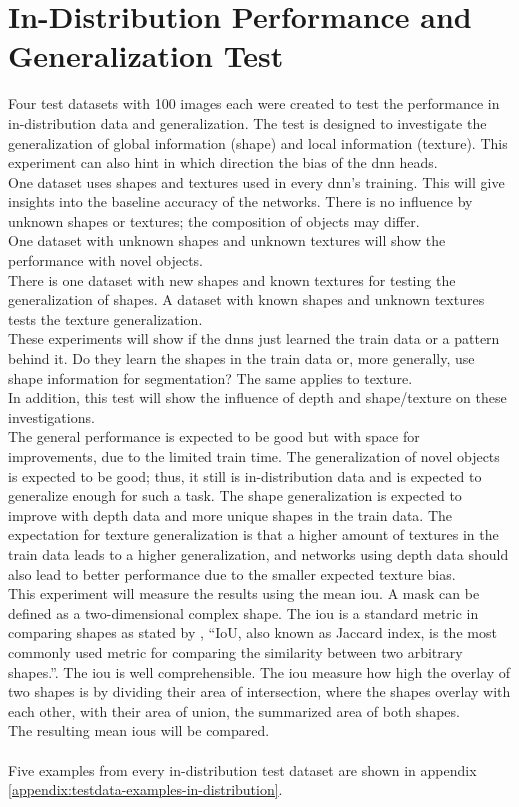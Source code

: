 	
	
	\section{In-Distribution Performance and Generalization Test}
	\label{sec:in-distribution-performance-generalization}
		Four test datasets with 100 images each were created to test the performance in in-distribution data and generalization. The test is designed to investigate the generalization of global information (shape) and local information (texture). This experiment can also hint in which direction the bias of the \ac{dnn} heads.\\
		One dataset uses shapes and textures used in every \ac{dnn}'s training. This will give insights into the baseline accuracy of the networks. There is no influence by unknown shapes or textures; the composition of objects may differ.\\
		One dataset with unknown shapes and unknown textures will show the performance with novel objects.\\
		There is one dataset with new shapes and known textures for testing the generalization of shapes. A dataset with known shapes and unknown textures tests the texture generalization.\\
		These experiments will show if the \ac{dnn}s just learned the train data or a pattern behind it. Do they learn the shapes in the train data or, more generally, use shape information for segmentation? The same applies to texture.\\
		In addition, this test will show the influence of depth and shape/texture on these investigations.\\
		The general performance is expected to be good but with space for improvements, due to the limited train time. The generalization of novel objects is expected to be good; thus, it still is in-distribution data and is expected to generalize enough for such a task. The shape generalization is expected to improve with depth data and more unique shapes in the train data. The expectation for texture generalization is that a higher amount of textures in the train data leads to a higher generalization, and networks using depth data should also lead to better performance due to the smaller expected texture bias.\\
		This experiment will measure the results using the mean \acl{iou}. A mask can be defined as a two-dimensional complex shape. The \ac{iou} is a standard metric in comparing shapes as stated by \textcite{Rezatofighi2019}, \enquote{IoU, also known as Jaccard index, is the most commonly used metric for comparing the similarity between two arbitrary shapes.}. The \ac{iou} is well comprehensible. The \ac{iou} measure how high the overlay of two shapes is by dividing their area of intersection, where the shapes overlay with each other, with their area of union, the summarized area of both shapes.\\
		The resulting mean \ac{iou}s will be compared.\\
		\\
		Five examples from every in-distribution test dataset are shown in appendix \ref{appendix:testdata-examples-in-distribution}.
	
